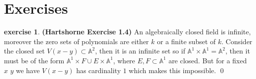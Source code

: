 \documentclass[10.5pt]{article}
\theoremstyle{definition}
\newtheorem{exe}{exercise}
\newcommand{\tor}{\text{ or }}
\begin{document}

    \section{Exercises}
    \begin{exe}\label{HS1.4}\textbf{(Hartshorne Exercise 1.4)}
        An algebraically closed field is infinite, moreover the zero sets of polynomials are either \(k\) or a finite subset of \(k\). Consider the closed set \(V(x-y) \subset \mathbb{A}^2\), then it is an infinite set so if \(\mathbb{A}^1\times \mathbb{A}^1 = \mathbb{A}^2\), then it must be of the form \(\mathbb{A}^1 \times F \cup E \times \mathbb{A}^1\), where \(E,F \subset \mathbb{A}^1\) are closed. But for a fixed \(x\) \tor \(y\) we have \(V(x-y)\) has cardinality \(1\) which makes this impossible. \qed
    \end{exe}
\end{document}

